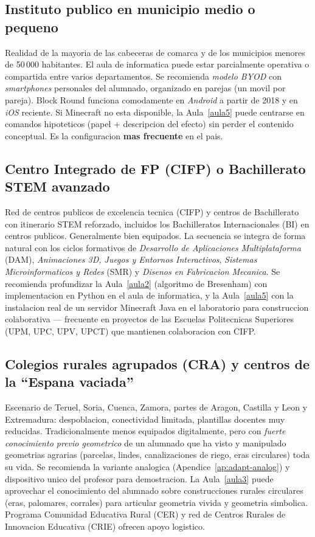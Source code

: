 \documentclass[12pt,a4paper]{scrartcl}
\newcommand{\acc}[1]{\textcolor{accent}{\textbf{#1}}}
\begin{document}
\subsection{Instituto publico en municipio medio o pequeno}
Realidad de la mayoria de las cabeceras de comarca y de los municipios menores de 50\,000 habitantes. El aula de informatica puede estar parcialmente operativa o compartida entre varios departamentos. Se recomienda \emph{modelo BYOD} con \emph{smartphones} personales del alumnado, organizado en parejas (un movil por pareja). Block Round funciona comodamente en \emph{Android} a partir de 2018 y en \emph{iOS} reciente. Si Minecraft no esta disponible, la Aula~\ref{aula5} puede centrarse en comandos hipoteticos (papel + descripcion del efecto) sin perder el contenido conceptual. Es la configuracion \acc{mas frecuente} en el pais.

\subsection{Centro Integrado de FP (CIFP) o Bachillerato STEM avanzado}
Red de centros publicos de excelencia tecnica (CIFP) y centros de Bachillerato con itinerario STEM reforzado, incluidos los Bachilleratos Internacionales (BI) en centros publicos. Generalmente bien equipados. La secuencia se integra de forma natural con los ciclos formativos de \emph{Desarrollo de Aplicaciones Multiplataforma} (DAM), \emph{Animaciones 3D, Juegos y Entornos Interactivos}, \emph{Sistemas Microinformaticos y Redes} (SMR) y \emph{Disenos en Fabricacion Mecanica}. Se recomienda profundizar la Aula~\ref{aula2} (algoritmo de Bresenham) con implementacion en Python en el aula de informatica, y la Aula~\ref{aula5} con la instalacion real de un servidor Minecraft Java en el laboratorio para construccion colaborativa --- frecuente en proyectos de las Escuelas Politecnicas Superiores (UPM, UPC, UPV, UPCT) que mantienen colaboracion con CIFP.

\subsection{Colegios rurales agrupados (CRA) y centros de la \enquote{Espana vaciada}}
Escenario de Teruel, Soria, Cuenca, Zamora, partes de Aragon, Castilla y Leon y Extremadura: despoblacion, conectividad limitada, plantillas docentes muy reducidas. Tradicionalmente menos equipados digitalmente, pero con \emph{fuerte conocimiento previo geometrico} de un alumnado que ha visto y manipulado geometrias agrarias (parcelas, lindes, canalizaciones de riego, eras circulares) toda su vida. Se recomienda la variante analogica (Apendice~\ref{ap:adapt-analog}) y dispositivo unico del profesor para demostracion. La Aula~\ref{aula3} puede aprovechar el conocimiento del alumnado sobre construcciones rurales circulares (eras, palomares, corrales) para articular geometria vivida y geometria simbolica. Programa Comunidad Educativa Rural (CER) y red de Centros Rurales de Innovacion Educativa (CRIE) ofrecen apoyo logistico.
\end{document}
